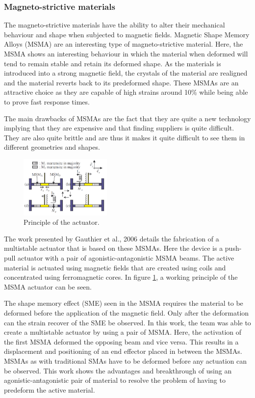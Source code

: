 \subsubsection{Magneto-strictive materials}
The magneto-strictive materials have the ability to alter their mechanical behaviour and shape when subjected to magnetic fields. Magnetic Shape Memory Alloys (MSMA) are an interesting type of magneto-strictive material. Here, the MSMA shows an interesting behaviour in which the material when deformed will tend to remain stable and retain its deformed shape. As the materials is introduced into a strong magnetic field, the crystals of the material are realigned and the material reverts back to its predeformed shape. These MSMAs are an attractive choice as they are capable of high strains around 10\% while being able to prove fast response times\cite{faran_ferromagnetic_2016}.

The main drawbacks of MSMAs are the fact that they are quite a new technology implying that they are expensive and that finding suppliers is quite difficult. They are also quite brittle and are thus it makes it quite difficult to see them in different geometries and shapes.
\begin{figure}
	\centering
	\includegraphics[width=0.4\textwidth]{Figures/MSMA_princ.png}
	\caption{Principle of the actuator\cite{gauthier_multistable_2006}.}
	\label{fig:MSMA_princ}
\end{figure}
The work presented by Gauthier et al., 2006\cite{gauthier_multistable_2006} details the fabrication of a multistable actuator that is based on these MSMAs. Here the device is a push-pull actuator with a pair of agonistic-antagonistic MSMA beams. The active material is actuated using magnetic fields that are created using coils and concentrated using ferromagnetic cores. In figure \ref{fig:MSMA_princ}, a working principle of the MSMA actuator can be seen.

The shape memory effect (SME) seen in the MSMA requires the material to be deformed before the application of the magnetic field. Only after the deformation can the strain recover of the SME be observed. In this work, the team was able to create a multistable actuator by using a pair of MSMA. Here, the activation of the first MSMA deformed the opposing beam and vice versa. This results in a displacement and positioning of an end effector placed in between the MSMAs. MSMAs as with traditional SMAs have to be deformed before any actuation can be observed. This work shows the advantages and breakthrough of using an agonistic-antagonistic pair of material to resolve the problem of having to predeform the active material.

